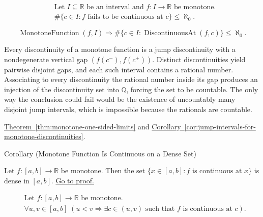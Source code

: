 \begin{remark*}
\[
\begin{aligned}
&\text{Let } I \subseteq \mathbb{R} \text{ be an interval and } f:I\to\mathbb{R} \text{ be monotone}.\\
&\#\{c \in I : f \text{ fails to be continuous at } c\} \le \aleph_0.
\end{aligned}
\]
\end{remark*}

\begin{remark*}
\[
\operatorname{MonotoneFunction}(f,I) \Longrightarrow \#\{c \in I : \operatorname{DiscontinuousAt}(f,c)\} \le \aleph_0.
\]
\end{remark*}

\begin{remark*}[Interpretation]
Every discontinuity of a monotone function is a jump discontinuity with a nondegenerate vertical gap $(f(c^-),f(c^+))$. Distinct discontinuities yield pairwise disjoint gaps, and each such interval contains a rational number. Associating to every discontinuity the rational number inside its gap produces an injection of the discontinuity set into $\mathbb{Q}$, forcing the set to be countable. The only way the conclusion could fail would be the existence of uncountably many disjoint jump intervals, which is impossible because the rationals are countable.
\end{remark*}

\begin{dependencies}
\hyperref[thm:monotone-one-sided-limits]{Theorem~\ref{thm:monotone-one-sided-limits}} and \hyperref[cor:jump-intervals-for-monotone-discontinuities]{Corollary~\ref{cor:jump-intervals-for-monotone-discontinuities}}.
\end{dependencies}

\begin{corollarybox}{Corollary (Monotone Function Is Continuous on a Dense Set)}
\begin{corollary}
\label{cor:monotone-continuous-on-dense-set}
Let $f:[a,b]\to\mathbb{R}$ be monotone. Then the set $\{x\in[a,b]:f \text{ is continuous at } x\}$ is dense in $[a,b]$.
\hyperref[prf:monotone-continuous-on-dense-set]{Go to proof.}
\end{corollary}
\end{corollarybox}

\begin{remark*}
\[
\begin{aligned}
&\text{Let } f:[a,b]\to\mathbb{R} \text{ be monotone.}\\
&\forall u,v\in[a,b] \; (u<v \Rightarrow \exists c\in(u,v)\text{ such that }f \text{ is continuous at } c).
\end{aligned}
\]
\end{remark*}

